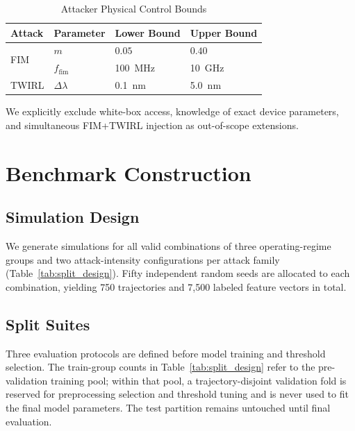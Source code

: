 \documentclass[journal,twocolumn]{IEEEtran}
\begin{document}
\begin{table}[t]
  \centering
  \caption{Attacker Physical Control Bounds}
  \label{tab:attack_bounds}
  \renewcommand{\arraystretch}{1.15}
  \begin{tabular}{@{}llll@{}}
    \toprule
    Attack & Parameter & Lower Bound & Upper Bound \\
    \midrule
    \multirow{2}{*}{FIM}
      & $m$            & $0.05$           & $0.40$ \\
      & $f_\mathrm{fim}$ & \SI{100}{\mega\hertz} & \SI{10}{\giga\hertz} \\
      \addlinespace
    TWIRL
      & $\Delta\lambda$ & \SI{0.1}{\nano\metre} & \SI{5.0}{\nano\metre} \\
    \bottomrule
  \end{tabular}
\end{table}

We explicitly exclude white-box access, knowledge of exact device parameters, and
simultaneous FIM+TWIRL injection as out-of-scope extensions.

\section{Benchmark Construction}
\label{sec:benchmark}

\subsection{Simulation Design}

We generate simulations for all valid combinations of three operating-regime groups
and two attack-intensity configurations per attack family
(Table~\ref{tab:split_design}). Fifty independent random seeds are allocated to
each combination, yielding 750 trajectories and 7{,}500 labeled feature vectors in
total.

\subsection{Split Suites}

Three evaluation protocols are defined before model training and threshold selection.
The train-group counts in Table~\ref{tab:split_design} refer to the pre-validation
training pool; within that pool, a trajectory-disjoint validation fold is reserved
for preprocessing selection and threshold tuning and is never used to fit the final
model parameters. The test partition remains untouched until final evaluation.
\end{document}
